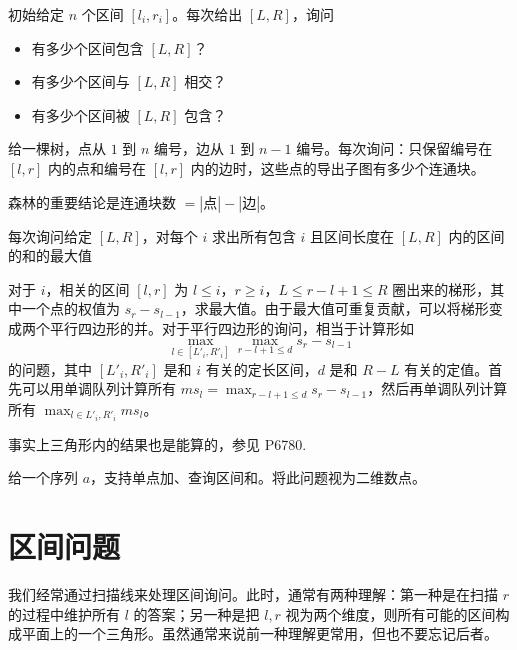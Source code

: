 \begin{example}[区间包含关系]
    初始给定 $n$ 个区间 $[l_i,r_i]$。每次给出 $[L,R]$，询问
    \begin{itemize}
        \item 有多少个区间包含 $[L,R]$？
        \item 有多少个区间与 $[L,R]$ 相交？
        \item 有多少个区间被 $[L,R]$ 包含？
    \end{itemize}
\end{example}
\begin{example}
    给一棵树，点从 $1$ 到 $n$ 编号，边从 $1$ 到 $n-1$ 编号。每次询问：只保留编号在 $[l,r]$ 内的点和编号在 $[l,r]$ 内的边时，这些点的导出子图有多少个连通块。
    \begin{hint}
        森林的重要结论是连通块数 $=|点| - |边|$。
    \end{hint}
\end{example}
\begin{example}
    每次询问给定 $[L,R]$，对每个 $i$ 求出所有包含 $i$ 且区间长度在 $[L,R]$ 内的区间的和的最大值
\end{example}
\begin{solution}
    对于 $i$，相关的区间 $[l,r]$ 为 $l\le i$，$r\ge i$，$L\le r-l+1\le R$ 圈出来的梯形，其中一个点的权值为 $s_r-s_{l-1}$，求最大值。由于最大值可重复贡献，可以将梯形变成两个平行四边形的并。对于平行四边形的询问，相当于计算形如
    $$
    \max_{l\in [L'_i,R'_i]}\max_{r-l+1\le d}s_r-s_{l-1}
    $$
    的问题，其中 $[L'_i,R'_i]$ 是和 $i$ 有关的定长区间，$d$ 是和 $R-L$ 有关的定值。首先可以用单调队列计算所有 $ms_l=\max_{r-l+1\le d}s_r-s_{l-1}$，然后再单调队列计算所有 $\max_{l\in L'_i,R'_i}ms_l$。
\end{solution}
\begin{remark}
    事实上三角形内的结果也是能算的，参见 P6780.
\end{remark}


\begin{example}[序列 $\times$ 时间]
    给一个序列 $a$，支持单点加、查询区间和。将此问题视为二维数点。
\end{example}

\section{区间问题}

我们经常通过扫描线来处理区间询问。此时，通常有两种理解：第一种是在扫描 $r$ 的过程中维护所有 $l$ 的答案；另一种是把 $l,r$ 视为两个维度，则所有可能的区间构成平面上的一个三角形。虽然通常来说前一种理解更常用，但也不要忘记后者。

